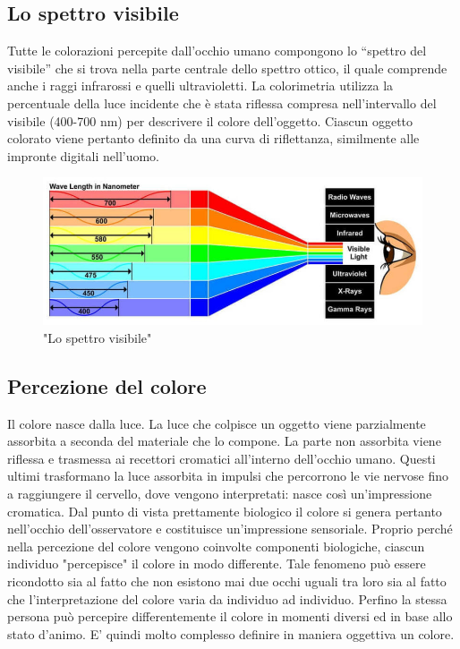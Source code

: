 \documentclass[a4paper,11pt]{article}
\begin{document}
        \subsection{Lo spettro visibile}
        Tutte le colorazioni percepite dall’occhio umano compongono lo “spettro del visibile” che si trova nella parte centrale dello spettro ottico, il quale
        comprende anche i raggi infrarossi e quelli ultravioletti. 
        La colorimetria utilizza la percentuale della luce incidente che è stata riflessa compresa
        nell'intervallo del visibile (400-700 nm) per descrivere il colore dell'oggetto. Ciascun oggetto
        colorato viene pertanto definito da una curva di riflettanza, similmente alle impronte digitali
        nell’uomo. 
        \begin{figure}[h]
            \centering
            \includegraphics[scale=0.45]{colorimetria3}
            \caption{"Lo spettro visibile"}
        \end{figure}
        \newpage
        \subsection{Percezione del colore}
        Il colore nasce dalla luce. La luce che colpisce un oggetto viene parzialmente assorbita a
        seconda del materiale che lo compone. La parte non assorbita viene riflessa e trasmessa ai recettori cromatici
        all’interno dell’occhio umano. Questi ultimi trasformano la luce assorbita in impulsi che
        percorrono le vie nervose fino a raggiungere il cervello, dove vengono interpretati: nasce così
        un’impressione cromatica. Dal punto di vista prettamente biologico il colore si genera pertanto
        nell’occhio dell’osservatore e costituisce un’impressione sensoriale.
        Proprio perché nella percezione del colore vengono coinvolte componenti biologiche, ciascun individuo "percepisce" il colore in modo
        differente. Tale fenomeno può essere ricondotto sia al fatto che non esistono mai due occhi
        uguali tra loro sia al fatto che l’interpretazione del colore varia da individuo ad individuo.
        Perfino la stessa persona può percepire differentemente il colore in momenti diversi ed in base
        allo stato d’animo. E' quindi molto complesso definire in maniera oggettiva un colore.
\end{document}
